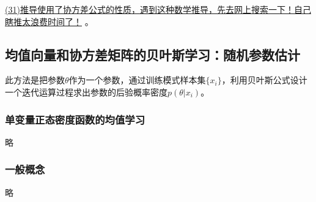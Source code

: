 \documentclass[12pt, letterpaper]{article}
\begin{document}
\href{https://blog.csdn.net/u010770993/article/details/72676440}{(31)推导使用了协方差公式的性质，遇到这种数学推导，先去网上搜索一下！自己瞎推太浪费时间了！} 。

\subsection{均值向量和协方差矩阵的贝叶斯学习：随机参数估计}
此方法是把参数$\theta$作为一个参数，通过训练模式样本集$\{x_i\}$，利用贝叶斯公式设计一个迭代运算过程求出参数的后验概率密度$p(\theta|x_i)$。

\subsubsection*{单变量正态密度函数的均值学习}
略
\subsubsection*{一般概念}
略
\end{document}
